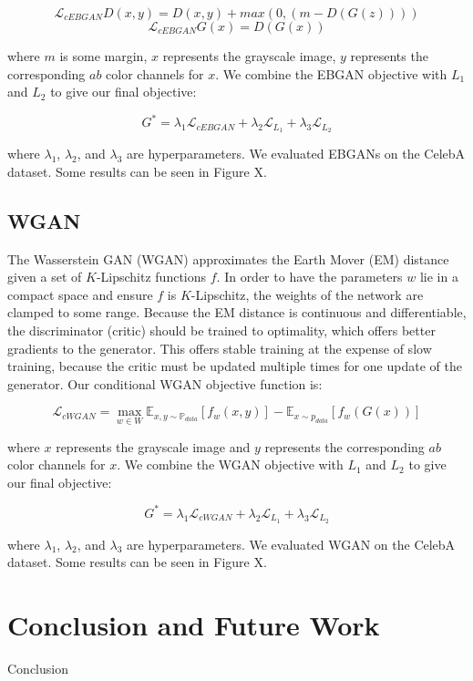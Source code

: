 \documentclass[10pt]{article}
\begin{document}
\[\mathcal{L}_{cEBGAN} D(x,y) = D(x,y) + max(0, (m-D(G(z)))) \]
\[\mathcal{L}_{cEBGAN} G(x) = D(G(x)) \]


\noindent where $m$ is some margin, $x$ represents the grayscale image, $y$ represents the corresponding
$ab$ color channels for $x$. We combine the EBGAN objective with $L_1$ and $L_2$ to give our final objective:

\[ G^* = \lambda_1 \mathcal{L}_{cEBGAN} + \lambda_2 \mathcal{L}_{L_1} + \lambda_3 \mathcal{L}_{L_2} \]

\noindent where $\lambda_1$, $\lambda_2$, and $\lambda_3$ are hyperparameters. We evaluated EBGANs on
the CelebA dataset. Some results can be seen in Figure X. 

\subsection{WGAN}
The Wasserstein GAN (WGAN) approximates the Earth Mover (EM) distance given a set of $K$-Lipschitz functions 
$f$. In order to have the parameters $w$ lie in a compact space and ensure $f$ is $K$-Lipschitz, the weights
of the network are clamped to some range. Because the EM distance is continuous and differentiable, the
discriminator (critic) should be trained to optimality, which offers better gradients to the generator. This 
offers stable training at the expense of slow training, because the critic must be updated multiple times
for one update of the generator. Our conditional WGAN objective function is:

\[\mathcal{L}_{cWGAN} = \max\limits_{w \in W} \mathbb{E}_{x,y \sim \mathbb{P}_{data}}[f_w(x,y)] -
\mathbb{E}_{x \sim p_{data}}[f_w(G(x))]\]

\noindent where $x$ represents the grayscale image and $y$ represents the corresponding
$ab$ color channels for $x$. We combine the WGAN objective with $L_1$ and $L_2$ to give our final objective:


\[ G^* = \lambda_1 \mathcal{L}_{cWGAN} + \lambda_2 \mathcal{L}_{L_1} + \lambda_3 \mathcal{L}_{L_2} \]

\noindent where $\lambda_1$, $\lambda_2$, and $\lambda_3$ are hyperparameters. We evaluated WGAN on
the CelebA dataset. Some results can be seen in Figure X. 



\section{Conclusion and Future Work}
Conclusion

\vspace{1mm}

\footnotesize

\end{document}
